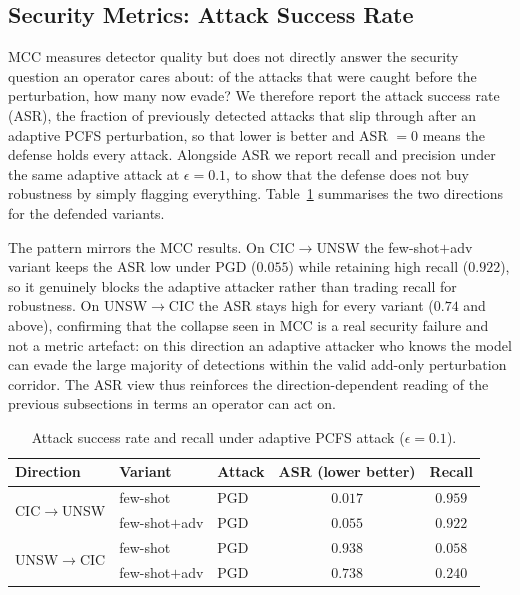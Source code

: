 \documentclass[11pt,a4paper]{article}
\begin{document}
\subsection{Security Metrics: Attack Success Rate}
\label{sec:asr}
MCC measures detector quality but does not directly answer the security question an
operator cares about: of the attacks that were caught before the perturbation, how
many now evade? We therefore report the attack success rate (ASR), the fraction of
previously detected attacks that slip through after an adaptive PCFS perturbation, so
that lower is better and ASR $=0$ means the defense holds every attack. Alongside ASR
we report recall and precision under the same adaptive attack at $\epsilon{=}0.1$, to
show that the defense does not buy robustness by simply flagging everything.
Table~\ref{tab:asr} summarises the two directions for the defended variants.

The pattern mirrors the MCC results. On CIC$\rightarrow$UNSW the few-shot$+$adv
variant keeps the ASR low under PGD ($0.055$) while retaining high recall ($0.922$),
so it genuinely blocks the adaptive attacker rather than trading recall for
robustness. On UNSW$\rightarrow$CIC the ASR stays high for every variant ($0.74$ and
above), confirming that the collapse seen in MCC is a real security failure and not a
metric artefact: on this direction an adaptive attacker who knows the model can evade
the large majority of detections within the valid add-only perturbation corridor. The
ASR view thus reinforces the direction-dependent reading of the previous subsections
in terms an operator can act on.

\begin{table}[htbp]
\centering
\caption{Attack success rate and recall under adaptive PCFS attack ($\epsilon{=}0.1$).}
\label{tab:asr}
\footnotesize
\begin{tabular}{lllcc}
\toprule
Direction & Variant & Attack & ASR (lower better) & Recall \\
\midrule
\multirow{2}{*}{CIC$\rightarrow$UNSW}
 & few-shot        & PGD  & $0.017$ & $0.959$ \\
 & few-shot$+$adv  & PGD  & $\mathbf{0.055}$ & $0.922$ \\
\midrule
\multirow{2}{*}{UNSW$\rightarrow$CIC}
 & few-shot        & PGD  & $0.938$ & $0.058$ \\
 & few-shot$+$adv  & PGD  & $0.738$ & $0.240$ \\
\bottomrule
\end{tabular}
\end{table}
\end{document}
